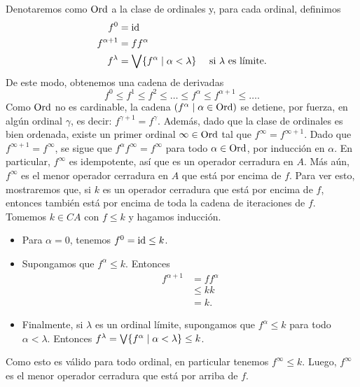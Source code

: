 Denotaremos como $\mathrm{Ord}$ a la clase de ordinales y, para cada
ordinal, definimos
\begin{align*}
  f^0 &= \mathrm{id} \\
  f^{\alpha+1} &= ff^\alpha \\
  f^\lambda &= \bigvee\{f^\alpha \mid \alpha<\lambda\}
    & \text{ si $\lambda$ es límite.}
\end{align*}
De este modo, obtenemos una cadena de derivadas
\[
  f^0\leq f^1\leq f^2\leq\dots\leq f^\alpha\leq f^{\alpha+1}
  \leq\dots
.\]
Como $\mathrm{Ord}$ no es cardinable, la cadena
$(f^\alpha \mid \alpha\in \mathrm{Ord} )$ se detiene, por fuerza, en
algún ordinal $\gamma$, es decir: $f^{\gamma+1}=f^\gamma$.
Además, dado que la clase de ordinales es bien ordenada,
existe un primer ordinal
$\infty\in\mathrm{Ord}$ tal que $f^\infty=f^{\infty+1}$.
Dado que $f^{\infty+1}=f^\infty$, se sigue que $f^\alpha
f^\infty=f^\infty$ para todo $\alpha\in\mathrm{Ord}$, por inducción en
$\alpha$. En particular,
$f^\infty$ es idempotente, así que es un operador cerradura en $A$.
Más aún, $f^\infty$ es el menor operador cerradura en $A$
que está por encima de $f$.
Para ver esto, mostraremos que, si $k$ es un operador cerradura
que está por encima de $f$, entonces también está por encima de
toda la cadena de iteraciones de $f$.
Tomemos $k\in CA$ con $f\leq k$ y hagamos inducción.
\begin{itemize}
  \item Para $\alpha=0$, tenemos $f^0=\mathrm{id}\leq k$.
  \item Supongamos que $f^\alpha\leq k$.
  Entonces
  \begin{align*}
    f^{\alpha+1}
    &= ff^\alpha \\
    &\leq kk \\
    &= k.
  \end{align*}
  \item Finalmente, si $\lambda$ es un ordinal límite, supongamos
  que $f^\alpha\leq k$ para todo $\alpha<\lambda$.
  Entonces
  $f^\lambda=\bigvee\{f^\alpha\mid \alpha<\lambda\}\leq k$.
\end{itemize}
Como esto es válido para todo ordinal, en particular tenemos
$f^\infty\leq k$.
Luego, $f^\infty$ es el menor operador cerradura que está por
arriba de $f$.

